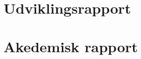 




\setcounter{page}{-100}
\frontmatter
{}
\pagestyle{empty}


\cleardoublepage
\pagestyle{ruled}


\tableofcontents*
\newpage
\thispagestyle{empty}
\hspace{1cm}
\newpage

\mainmatter
\part{Udviklingsrapport}







\part{Akedemisk rapport}


\newpage
	




\appendix



